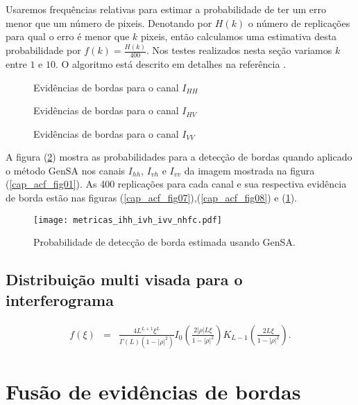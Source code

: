 Usaremos frequências relativas para estimar a probabilidade de ter um erro menor que um número de pixeis. Denotando por $H(k)$ o número de replicações para qual o erro é menor que $k$ pixeis, então calculamos uma estimativa desta probabilidade por $f(k)=\frac{H(k)}{400}$. Nos testes realizados nesta seção variamos $k$ entre $1$ e $10$. O algoritmo está descrito em detalhes na referência \citep{fbgm}. 
\begin{figure}[hbt]
\caption{Evidências de bordas para o canal $I_{HH}$}\label{cap_acf_fig07}
\endminipage\hfill
{}
\caption{Evidências de bordas para o canal $I_{HV}$}\label{cap_acf_fig08}
\endminipage\hfill
\centering
{}
\caption{Evidências de bordas para o canal $I_{VV}$}\label{cap_acf_fig09}
\endminipage\hfill
\end{figure}

	A figura (\ref{cap_acf_fig10}) mostra as probabilidades para a detecção de bordas quando aplicado o método GenSA nos canais $I_{hh}$, $I_{vh}$ e $I_{vv}$ da imagem mostrada na figura (\ref{cap_acf_fig01}). As 400 replicações para cada canal e sua respectiva evidência de borda estão nas figuras (\ref{cap_acf_fig07}),(\ref{cap_acf_fig08}) e (\ref{cap_acf_fig09}).  
\begin{figure}[hbt]
\centering
	\texttt{[image: metricas\_ihh\_ivh\_ivv\_nhfc.pdf]}
	\caption{Probabilidade de detecção de borda estimada usando GenSA.}
\label{cap_acf_fig10}
\end{figure}


\subsection{Distribuição multi visada para o interferograma}

\begin{equation}
\begin{array}{ccc}
	f(\xi)&=&\frac{4L^{L+1}\xi^L}{\Gamma(L)(1-|\rho|^2)}I_0\left(\frac{2|\rho|L\xi}{1-|\rho|^2}\right)K_{L-1}\left(\frac{2L\xi}{1-|\rho|^2}\right).
		\end{array}
\end{equation}



\section{Fusão de evidências de bordas}

